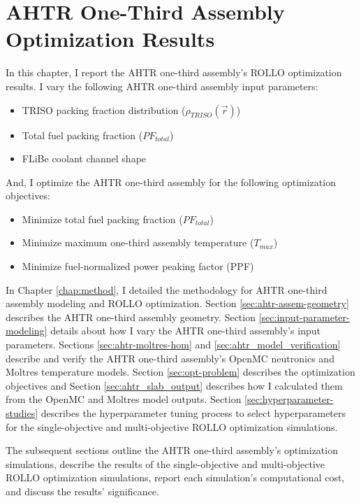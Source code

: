 \chapter{AHTR One-Third Assembly Optimization Results}
\glsresetall
\label{chap:ahtr-assem-opt-results}
In this chapter, I report the \gls{AHTR} one-third assembly's \gls{ROLLO} optimization 
results. 
I vary the following \gls{AHTR} one-third assembly input parameters:
\begin{itemize}
    \item \gls{TRISO} packing fraction distribution ($\rho_{TRISO}(\vec{r})$)
    \item Total fuel packing fraction ($PF_{total}$)
    \item \gls{FLiBe} coolant channel shape
\end{itemize} 
And, I optimize the \gls{AHTR} one-third assembly for the following optimization 
objectives:
\begin{itemize}
    \item Minimize total fuel packing fraction ($PF_{total}$)
    \item Minimize maximum one-third assembly temperature ($T_{max}$)
    \item Minimize fuel-normalized power peaking factor (PPF)
\end{itemize} 
 
In Chapter \ref{chap:method}, I detailed the methodology for \gls{AHTR} one-third 
assembly modeling and \gls{ROLLO} optimization. 
Section \ref{sec:ahtr-assem-geometry} describes the \gls{AHTR} one-third assembly 
geometry.
Section \ref{sec:input-parameter-modeling} details about how I vary the 
\gls{AHTR} one-third assembly's input parameters. 
Sections \ref{sec:ahtr-moltres-hom} and \ref{sec:ahtr_model_verification}
describe and verify the \gls{AHTR} one-third assembly's OpenMC neutronics and Moltres 
temperature models. 
Section \ref{sec:opt-problem} describes the optimization objectives and Section 
\ref{sec:ahtr_slab_output} describes how I calculated them from the OpenMC and Moltres 
model outputs. 
Section \ref{sec:hyperparameter-studies} describes the hyperparameter tuning process 
to select hyperparameters for the single-objective and multi-objective \gls{ROLLO} 
optimization simulations.

The subsequent sections outline the \gls{AHTR} one-third assembly's optimization 
simulations, describe the results of the single-objective and multi-objective 
\gls{ROLLO} optimization simulations, report each simulation's computational cost, 
and discuss the results' significance.


